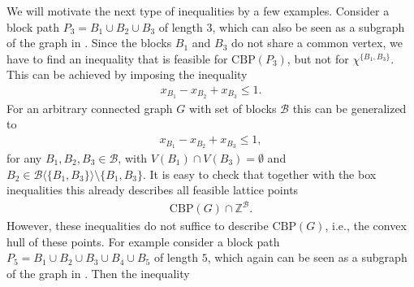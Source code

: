 \documentclass[12pt]{amsart}
\newcommand{\Z}{\mathbb{Z}}
\newcommand{\CBP}{\mathrm{CBP}}
\newcommand{\B}{\mathcal{B}}
\newcommand{\A}{\mathcal{A}}
\newcommand{\Xr}[1]{}
\newcommand{\Xn}[1]{{\protect#1}}
\begin{document}
We will motivate the next type of inequalities by a few examples. Consider a block path $P_3=B_1 \cup B_2 \cup B_3$ of length $3$\Xn{, which can also be seen as a subgraph of the graph in \Cref{fig:Example}}. \Xr{We have to ensure that it is not possible to choose both $B_1$ and $B_3$ without choosing $B_2$.}\Xn{Since the blocks $B_1$ and $B_3$ do not share a common vertex, we have to find an inequality that is feasible for $\CBP(P_3)$, but not for $\chi^{\{B_1,B_3\}}$.} This can be achieved by imposing the inequality
\begin{align*}
    x_{B_1}-x_{B_2}+x_{B_3} \le 1.
\end{align*}
\Xr{since this forbids the incidence vector $\chi^{\{B_1,B_3\}}$.} For an arbitrary connected graph $G$ with set of blocks $\B$ this can be generalized to
\begin{align}
    \label{ILP}
    x_{B_1}-x_{B_2}+x_{B_3} \le 1,
\end{align}
for any $B_1,B_2,B_3 \in \B$, with $V(B_1) \cap V(B_3)=\emptyset$ and  $B_2 \in \B \langle\{B_1,B_3\}\rangle\setminus \{B_1,B_3\}$. It is easy to check that together with the box inequalities this already describes all feasible lattice points
\begin{align*}
    \CBP(G) \cap \Z^\B.
\end{align*}
However, these inequalities do not suffice to describe $\CBP(G)$, i.e., the convex hull of these points. For example consider a block path $P_5=B_1\cup B_2\cup B_3\cup B_4\cup B_5$ of length $5$\Xn{, which again can be seen as a subgraph of the graph in \Cref{fig:Example}}. Then the inequality
\end{document}
